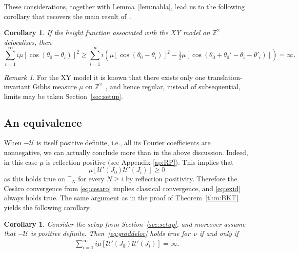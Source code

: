 \documentclass[11pt, reqno]{amsart}
\newtheorem{corollary}[theorem]{Corollary}
\numberwithin{equation}{section}
\theoremstyle{definition}
\theoremstyle{remark}
\newtheorem{remark}{Remark}
\newcommand{\J}{J}
\begin{document}
These considerations, together with Lemma~\ref{lem:nabla}, lead us to the following corollary that recovers the main result of~\cite{vEnLis}. 

\begin{corollary}\label{C: deloc BKT}
	If the height function associated with the XY model on $\mathbb Z^2$ delocalises, then  
	\[
	\sum_{i=1}^\infty  i  \mu[ \cos ( \theta _0-\theta_i)]^2 \geq \sum_{i=1}^\infty  i  (\mu[ \cos ( \theta _0-\theta_i)]^2-\tfrac12\mu[\cos(\theta_0+\theta_0'-\theta_i-\theta'_i)]) = \infty.
	\] 
\end{corollary}

\begin{remark}
For the XY model it is known that there exists only one translation-invariant Gibbs measure $\mu$ on $\mathbb Z^2$~\cite{Pfister}, and hence regular, instead of subsequential, limits may be taken Section~\ref{sec:setup}.
\end{remark}

\subsection{An equivalence}
When $-\mathcal U$ is itself positive definite, i.e., all its Fourier coefficients are nonnegative, we can actually conclude more than in the above discussion. Indeed, in this case $\mu$ is reflection positive (see Appendix \ref{ap:RP}). This implies that 
\[
\mu [\mathcal U'(\J_0)\mathcal U'(\J_i)] \geq 0
\] 
as this holds true on $\mathbb T_N$ for every $N\geq i$ by reflection positivity. Therefore the Ces\`aro convergence from \eqref{eq:cesaro} implies classical convergence, and \eqref{eq:exid} always holds true.
The same argument as in the proof of Theorem~\ref{thm:BKT} yields the following corollary.
\begin{corollary} \label{cor:equiv}
Consider the setup from Section~\ref{sec:setup}, and moreover assume that $-\mathcal U$ is positive definite. 
Then~\eqref{eq:graddeloc} holds true for~$\nu$ if and only if
	\begin{align} \label{eq:infinite}
		\sum_{i=1}^\infty  i \mu [\mathcal U'(\J_0)\mathcal U'(\J_i)]= \infty. 
	\end{align}
\end{corollary}
\end{document}

